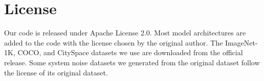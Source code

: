\section{License}
\label{license}
Our code is released under Apache License 2.0. Most model architectures are added to the code with the license chosen by the original author. The ImageNet-1K, COCO, and CitySpace datasets we use are downloaded from the official release. Some system noise datasets we generated from the original dataset follow the license of its original dataset.
